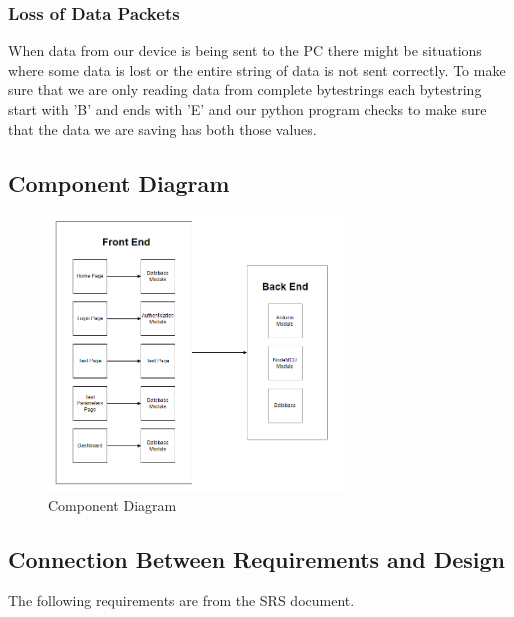 \documentclass[12pt, titlepage]{article}
\begin{document}
\subsubsection{Loss of Data Packets}
When data from our device is being sent to the PC there might be situations where some data is lost or the entire string of data is not sent correctly. To make sure that we are only reading data from complete bytestrings each bytestring start with 'B' and ends with 'E' and our python program checks to make sure that the data we are saving has both those values.


\subsection{Component Diagram}
\begin{figure}[hbt!]
  \begin{center}
  \includegraphics[width=0.7\textwidth]{component_diagram.png}
  \caption{Component Diagram} 
  \end{center}
  \end{figure}

\newpage
\subsection{Connection Between Requirements and Design} \label{SecConnection}
The following requirements are from the SRS document.
\end{document}
